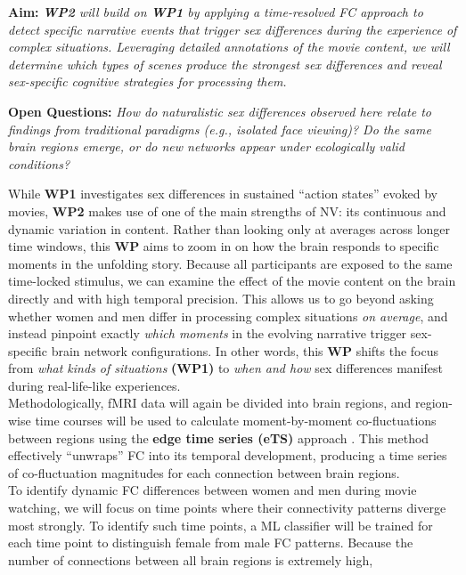 \documentclass[11pt,a4paper]{article}
\begin{document}
\textbf{Aim:} \textit{\textbf{WP2} will build on \textbf{WP1} by applying a time-resolved FC approach to detect specific narrative events 
that trigger sex differences during the experience of complex situations. Leveraging detailed annotations of the movie content,
we will determine which types of scenes produce the strongest sex differences and reveal sex-specific cognitive strategies 
for processing them.}

\textbf{Open Questions:} \textit{How do naturalistic sex differences observed here relate to findings 
from traditional paradigms (e.g., isolated face viewing)? Do the same brain regions emerge, 
or do new networks appear under ecologically valid conditions?}  

While \textbf{WP1} investigates sex differences in sustained “action states” evoked by movies, 
\textbf{WP2} makes use of one of the main strengths of NV: its continuous and dynamic variation in content. 
Rather than looking only at averages across longer time windows, this \textbf{WP} aims to zoom in on how the brain responds 
to specific moments in the unfolding story. 
Because all participants are exposed to the same time-locked stimulus, we can examine the effect of the movie 
content on the brain directly and with high temporal precision. This allows us to go beyond asking whether women and 
men differ in processing complex situations \textit{on average}, and instead pinpoint exactly \textit{which moments} in the 
evolving narrative trigger sex-specific brain network configurations. 
In other words, this \textbf{WP} shifts the focus from \textit{what kinds of situations} \textbf{(WP1)} to 
\textit{when and how} sex differences manifest during real-life-like experiences.\\
Methodologically, fMRI data will again be divided into brain regions, and region-wise time courses 
will be used to calculate moment-by-moment co-fluctuations between regions using the \textbf{edge time series (eTS)} 
approach \parencite{betzelLivingEdgeNetwork2023,faskowitzEdgecentricFunctionalNetwork2020a}. 
This method effectively “unwraps” FC into its temporal development, producing a time series of co-fluctuation magnitudes 
for each connection between brain regions.\\
To identify dynamic FC differences between women and men during movie watching, we will focus on time points where 
their connectivity patterns diverge most strongly. To identify such time points, a ML classifier will be trained for each
time point to distinguish female from male FC patterns. Because the number of connections between all brain regions is extremely high, 
\end{document}
